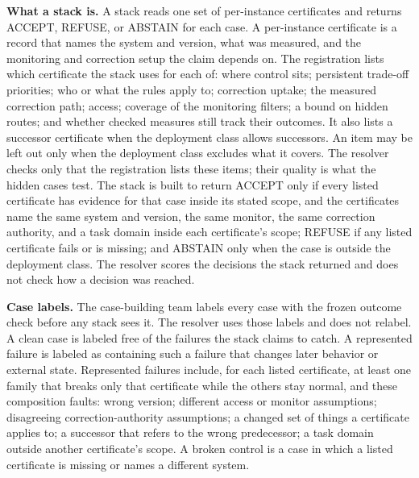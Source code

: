 \begin{predictionresolution}
\textbf{What a stack is.}
A stack reads one set of per-instance certificates and returns ACCEPT, REFUSE, or ABSTAIN for each case.
A per-instance certificate is a record that names the system and version, what was measured, and the monitoring and correction setup the claim depends on.
The registration lists which certificate the stack uses for each of: where control sits; persistent trade-off priorities; who or what the rules apply to; correction uptake; the measured correction path; access; coverage of the monitoring filters; a bound on hidden routes; and whether checked measures still track their outcomes.
It also lists a successor certificate when the deployment class allows successors.
An item may be left out only when the deployment class excludes what it covers.
The resolver checks only that the registration lists these items; their quality is what the hidden cases test.
The stack is built to return ACCEPT only if every listed certificate has evidence for that case inside its stated scope, and the certificates name the same system and version, the same monitor, the same correction authority, and a task domain inside each certificate's scope; REFUSE if any listed certificate fails or is missing; and ABSTAIN only when the case is outside the deployment class.
The resolver scores the decisions the stack returned and does not check how a decision was reached.

\textbf{Case labels.}
The case-building team labels every case with the frozen outcome check before any stack sees it.
The resolver uses those labels and does not relabel.
A clean case is labeled free of the failures the stack claims to catch.
A represented failure is labeled as containing such a failure that changes later behavior or external state.
Represented failures include, for each listed certificate, at least one family that breaks only that certificate while the others stay normal, and these composition faults: wrong version; different access or monitor assumptions; disagreeing correction-authority assumptions; a changed set of things a certificate applies to; a successor that refers to the wrong predecessor; a task domain outside another certificate's scope.
A broken control is a case in which a listed certificate is missing or names a different system.


\end{predictionresolution}
